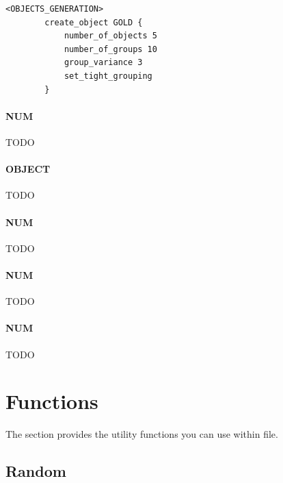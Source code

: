 \begin{appendices}
    \begin{lstlisting}[language={rms}, label={lst:groupvariance}, caption={Example showing how you can create different groups of object in the whole map, with different number of objects in each group.}]
        <OBJECTS_GENERATION>
        create_object GOLD {
            number_of_objects 5
            number_of_groups 10
            group_variance 3
            set_tight_grouping
        }
    \end{lstlisting}

    \paragraph{ NUM}

    TODO

    \paragraph{ OBJECT}

    TODO

    \paragraph{ NUM}

    TODO 

    \paragraph{ NUM}

    TODO

    \paragraph{ NUM}

    TODO

    \section{Functions}

    The section provides the utility functions you can use within  file.

    \subsection{Random}


\end{appendices}
